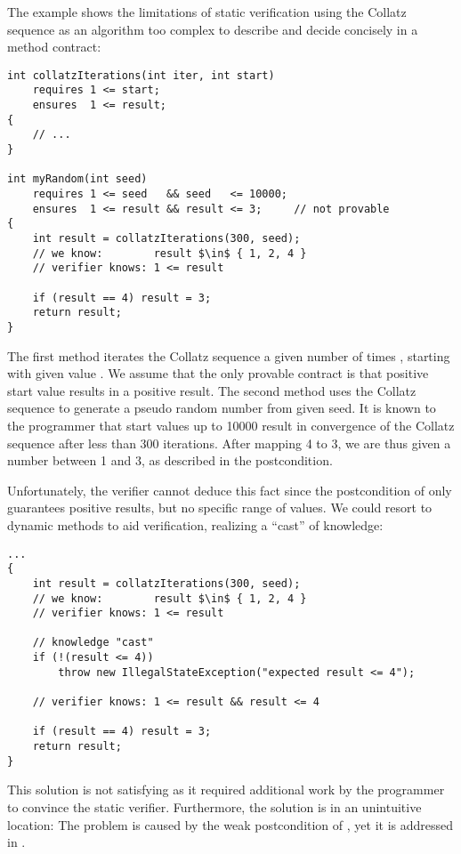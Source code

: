 The example shows the limitations of static verification using the Collatz sequence as an algorithm too complex to describe and decide concisely in a method contract:
\begin{lstlisting}
int collatzIterations(int iter, int start)
    requires 1 <= start;
    ensures  1 <= result;
{
    // ...
}

int myRandom(int seed)
    requires 1 <= seed   && seed   <= 10000;
    ensures  1 <= result && result <= 3;     // not provable
{
    int result = collatzIterations(300, seed);
    // we know:        result $\in$ { 1, 2, 4 }
    // verifier knows: 1 <= result
    
    if (result == 4) result = 3;
    return result;
}
\end{lstlisting}
The first method  iterates the Collatz sequence a given number of times , starting with given value .
We assume that the only provable contract is that positive start value results in a positive result.
The second method  uses the Collatz sequence to generate a pseudo random number from given seed.
It is known to the programmer that start values up to 10000 result in convergence of the Collatz sequence after less than 300 iterations.
After mapping 4 to 3, we are thus given a number between 1 and 3, as described in the postcondition.

Unfortunately, the verifier cannot deduce this fact since the postcondition of  only guarantees positive results, but no specific range of values.
We could resort to dynamic methods to aid verification, realizing a “cast” of knowledge:

\begin{lstlisting}
...
{
    int result = collatzIterations(300, seed);
    // we know:        result $\in$ { 1, 2, 4 }
    // verifier knows: 1 <= result
    
    // knowledge "cast"
    if (!(result <= 4))
        throw new IllegalStateException("expected result <= 4");

    // verifier knows: 1 <= result && result <= 4 
    
    if (result == 4) result = 3;
    return result;
}
\end{lstlisting}

This solution is not satisfying as it required additional work by the programmer to convince the static verifier.
Furthermore, the solution is in an unintuitive location:
The problem is caused by the weak postcondition of , yet it is addressed in .

